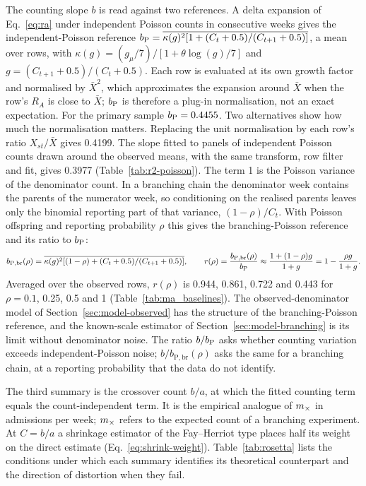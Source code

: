 The counting slope $b$ is read against two references. A delta expansion of Eq.~\eqref{eq:ra} under independent Poisson counts in consecutive weeks gives the independent-Poisson reference
$b_{\mathrm P}=\overline{\kappa(g)^2[1+(C_t+0.5)/(C_{t+1}+0.5)]}$, a mean over rows, with $\kappa(g)=(g_\mu/7)/[1+\theta\log(g)/7]$ and $g=(C_{t+1}+0.5)/(C_t+0.5)$. Each row is evaluated at its own growth factor and normalised by $\bar X^2$, which approximates the expansion around $\bar X$ when the row's $R_A$ is close to $\bar X$; $b_{\mathrm P}$ is therefore a plug-in normalisation, not an exact expectation. For the primary sample $b_{\mathrm P}=0.4455$. Two alternatives show how much the normalisation matters. Replacing the unit normalisation by each row's ratio $X_{st}/\bar X$ gives 0.4199. The slope fitted to panels of independent Poisson counts drawn around the observed means, with the same transform, row filter and fit, gives 0.3977 (Table~\ref{tab:r2-poisson}). The term 1 is the Poisson variance of the denominator count. In a branching chain the denominator week contains the parents of the numerator week, so conditioning on the realised parents leaves only the binomial reporting part of that variance, $(1-\rho)/C_t$. With Poisson offspring and reporting probability $\rho$ this gives the branching-Poisson reference and its ratio to $b_{\mathrm P}$:
\begin{equation}
b_{\mathrm{P,br}}(\rho)=\overline{\kappa(g)^2[(1-\rho)+(C_t+0.5)/(C_{t+1}+0.5)]},\qquad
r(\rho)=\frac{b_{\mathrm{P,br}}(\rho)}{b_{\mathrm P}}\approx\frac{1+(1-\rho)g}{1+g}=1-\frac{\rho g}{1+g}.
\label{eq:branching-reference}
\end{equation}
Averaged over the observed rows, $r(\rho)$ is 0.944, 0.861, 0.722 and 0.443 for $\rho=0.1$, 0.25, 0.5 and 1 (Table~\ref{tab:ma_baselines}). The observed-denominator model of Section~\ref{sec:model-observed} has the structure of the branching-Poisson reference, and the known-scale estimator of Section~\ref{sec:model-branching} is its limit without denominator noise. The ratio $b/b_{\mathrm P}$ asks whether counting variation exceeds independent-Poisson noise; $b/b_{\mathrm{P,br}}(\rho)$ asks the same for a branching chain, at a reporting probability that the data do not identify.

The third summary is the crossover count $b/a$, at which the fitted counting term equals the count-independent term. It is the empirical analogue of $m_\times$ in admissions per week; $m_\times$ refers to the expected count of a branching experiment. At $C=b/a$ a shrinkage estimator of the Fay--Herriot type places half its weight on the direct estimate (Eq.~\eqref{eq:shrink-weight}). Table~\ref{tab:rosetta} lists the conditions under which each summary identifies its theoretical counterpart and the direction of distortion when they fail.

